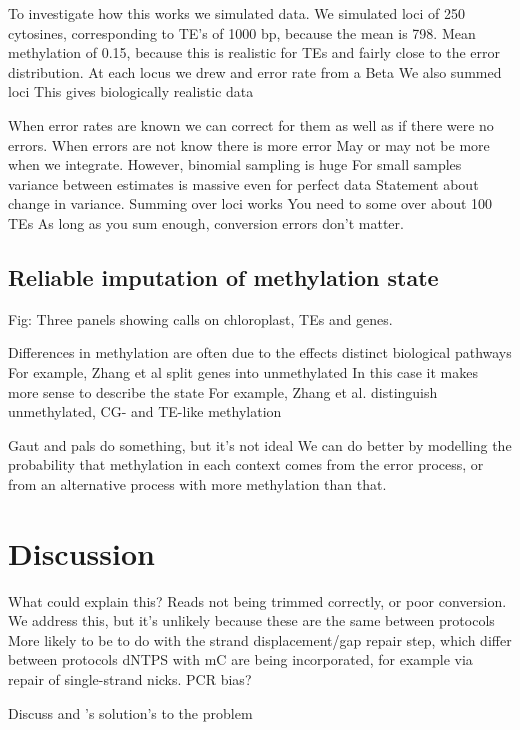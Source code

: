 \documentclass[12pt,longbibliography]{article}
\begin{document}
To investigate how this works we simulated data.
We simulated loci of 250 cytosines, corresponding to TE's of 1000 bp, because the mean is 798.
Mean methylation of 0.15, because this is realistic for TEs and fairly close to the error distribution.
At each locus we drew and error rate from a Beta
We also summed loci
This gives biologically realistic data

When error rates are known we can correct for them as well as if there were no errors.
When errors are not know there is more error
May or may not be more when we integrate.
However, binomial sampling is huge
For small samples variance between estimates is massive even for perfect data
Statement about change in variance.
Summing over loci works
You need to some over about 100 TEs
As long as you sum enough, conversion errors don't matter.

\subsection{Reliable imputation of methylation state}

Fig: Three panels showing calls on chloroplast, TEs and genes.

Differences in methylation are often due to the effects distinct biological pathways
For example, Zhang et al split genes into unmethylated 
In this case it makes more sense to describe the state
For example, Zhang et al. distinguish unmethylated, CG- and TE-like methylation

Gaut and pals do something, but it's not ideal
We can do better by modelling the probability that methylation in each context
comes from the error process, or from an alternative process with more methylation
than that.



\section{Discussion}


What could explain this?
Reads not being trimmed correctly, or poor conversion.
We address this, but it's unlikely because these are the same between protocols
More likely to be to do with the strand displacement/gap repair step, which differ between protocols
dNTPS with mC are being incorporated, for example via repair of single-strand nicks.
PCR bias?


Discuss \cite{lu2015improved} and \cite{suzuki2018whole}'s solution's to the problem
\end{document}
